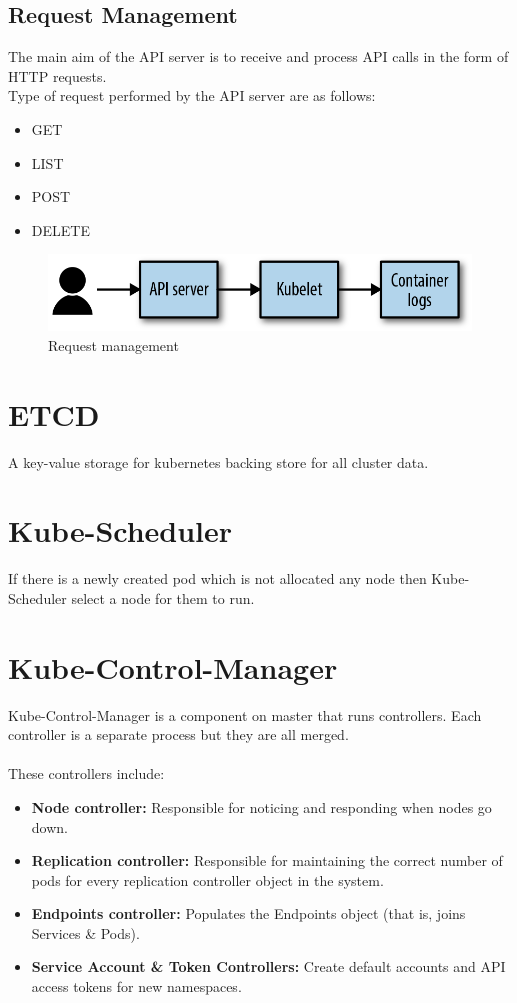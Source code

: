 \documentclass[12pt]{report}
\begin{document}
\subsection{Request Management}
The main aim of the API server is to receive and process API calls in the form of HTTP requests.\\
Type of request performed by the API server are as follows:
\begin{itemize}
	\item GET
	\item LIST
	\item POST
	\item DELETE
\end{itemize}
\begin{figure}[h!]
	\begin{center}
		\includegraphics[totalheight=0.1\textheight]{kubereqman}
		\caption{Request management \cite{Request}}
	\end{center}
\end{figure}
\section{ETCD}
A key-value storage for kubernetes backing store for all cluster data.
\section{Kube-Scheduler}
If there is a newly created pod which is not allocated any node then Kube-Scheduler select a node for them to run.
\section{Kube-Control-Manager}
Kube-Control-Manager is a component on master that runs controllers.
Each controller is a separate process but they are all merged.\\\\
These controllers include:
\begin{itemize}
	\item \textbf{Node controller:} Responsible for noticing and responding when nodes go down.
	\item \textbf{Replication controller:} Responsible for maintaining the correct number of pods for every replication controller object in the system.
	\item \textbf{Endpoints controller:} Populates the Endpoints object (that is, joins Services \& Pods).
	\item \textbf{Service Account \& Token Controllers:} Create default accounts and API access tokens for new namespaces.
\end{itemize}
\end{document}
